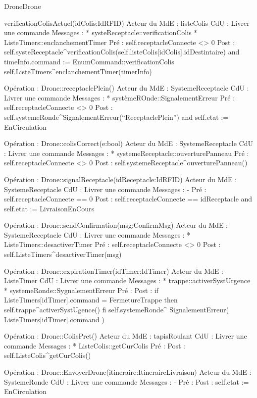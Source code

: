 \begin{OM}{Drone}{Drone}
    \begin{OMOperation}{}{}{}
        \begin{OMMessages}
            \OMMessage{}{}
        \end{OMMessages}

        \begin{OMPre}
        \end{OMPre}

        \begin{OMPost}
        \end{OMPost}
    \end{OMOperation}

verificationColisActuel(idColis:IdRFID)
Acteur du MdE : listeColis
CdU : Livrer une commande
Messages : 
* systeReceptacle::{verificationColis}
* ListeTimers::{enclanchementTimer}
Pré : self.receptacleConnecte <> 0
Post :
        self.systeReceptacle^verificationColis(self.listeColis[idColis].idDestintaire)
        and
        timeInfo.command := EnumCommand::verificationColis
        self.ListeTimers^enclanchementTimer(timerInfo)


Opération : Drone::receptaclePlein()
Acteur du MdE : SystemeReceptacle
CdU : Livrer une commande
Messages : 
* systèmeROnde::{SignalementErreur}
Pré : self.receptacleConnecte <> 0
Post :
        self.systemeRonde^SignalementErreur(“ReceptaclePlein”)
        and
self.etat := EnCirculation


Opération : Drone::colisCorrect(e:bool)
Acteur du MdE : SystemeReceptacle
CdU : Livrer une commande
Messages : 
* systemeReceptacle::{ouverturePanneau}
Pré : self.receptacleConnecte <> 0
Post :
        self.systemeReceptacle^ouverturePanneau()


Opération : Drone::signalReceptacle(idReceptacle:IdRFID)
Acteur du MdE : SystemeReceptacle
CdU : Livrer une commande
Messages : -
Pré : self.receptacleConnecte == 0
Post :
        self.receptacleConnecte == idReceptacle
        and 
        self.etat := LivraisonEnCours


Opération : Drone::sendConfirmation(msg:ConfirmMsg)
Acteur du MdE : SystemeReceptacle
CdU : Livrer une commande
Messages : 
* ListeTimers::{desactiverTimer}
Pré : self.receptacleConnecte <> 0
Post :
        self.ListeTimers^desactiverTimer(msg)




Opération : Drone::expirationTimer(idTimer:IdTimer)
Acteur du MdE : ListeTimer
CdU : Livrer une commande
Messages : 
* trappe::{activerSystUrgence}
* systemeRonde::{SygnalementErreur}
Pré :
Post :
        if ListeTimers[idTimer].command = FermetureTrappe then
                self.trappe^activerSystUgence()
        fi
        self.systemeRonde^ SignalementErreur( ListeTimers[idTimer].command )


Opération : Drone::ColisPret()
Acteur du MdE : tapisRoulant
CdU : Livrer une commande
Messages : 
* ListeColis::{getCurColis}
Pré :
Post :
        self.ListeColis^getCurColis()


Opération : Drone::EnvoyerDrone(itineraire:ItineraireLivraison)
Acteur du MdE : SystemeRonde
CdU : Livrer une commande
Messages : -
Pré :
Post :
        self.etat := EnCirculation
\end{OM}
